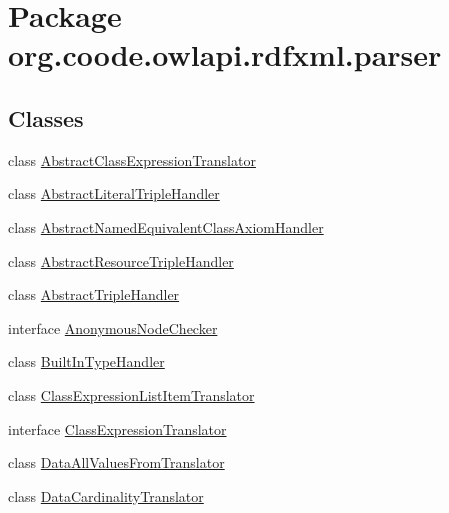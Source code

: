 \hypertarget{namespaceorg_1_1coode_1_1owlapi_1_1rdfxml_1_1parser}{\section{Package org.\-coode.\-owlapi.\-rdfxml.\-parser}
\label{namespaceorg_1_1coode_1_1owlapi_1_1rdfxml_1_1parser}
}
\subsection*{Classes}
\begin{DoxyCompactItemize}
\item 
class \hyperlink{classorg_1_1coode_1_1owlapi_1_1rdfxml_1_1parser_1_1_abstract_class_expression_translator}{Abstract\-Class\-Expression\-Translator}
\item 
class \hyperlink{classorg_1_1coode_1_1owlapi_1_1rdfxml_1_1parser_1_1_abstract_literal_triple_handler}{Abstract\-Literal\-Triple\-Handler}
\item 
class \hyperlink{classorg_1_1coode_1_1owlapi_1_1rdfxml_1_1parser_1_1_abstract_named_equivalent_class_axiom_handler}{Abstract\-Named\-Equivalent\-Class\-Axiom\-Handler}
\item 
class \hyperlink{classorg_1_1coode_1_1owlapi_1_1rdfxml_1_1parser_1_1_abstract_resource_triple_handler}{Abstract\-Resource\-Triple\-Handler}
\item 
class \hyperlink{classorg_1_1coode_1_1owlapi_1_1rdfxml_1_1parser_1_1_abstract_triple_handler}{Abstract\-Triple\-Handler}
\item 
interface \hyperlink{interfaceorg_1_1coode_1_1owlapi_1_1rdfxml_1_1parser_1_1_anonymous_node_checker}{Anonymous\-Node\-Checker}
\item 
class \hyperlink{classorg_1_1coode_1_1owlapi_1_1rdfxml_1_1parser_1_1_built_in_type_handler}{Built\-In\-Type\-Handler}
\item 
class \hyperlink{classorg_1_1coode_1_1owlapi_1_1rdfxml_1_1parser_1_1_class_expression_list_item_translator}{Class\-Expression\-List\-Item\-Translator}
\item 
interface \hyperlink{interfaceorg_1_1coode_1_1owlapi_1_1rdfxml_1_1parser_1_1_class_expression_translator}{Class\-Expression\-Translator}
\item 
class \hyperlink{classorg_1_1coode_1_1owlapi_1_1rdfxml_1_1parser_1_1_data_all_values_from_translator}{Data\-All\-Values\-From\-Translator}
\item 
class \hyperlink{classorg_1_1coode_1_1owlapi_1_1rdfxml_1_1parser_1_1_data_cardinality_translator}{Data\-Cardinality\-Translator}

\end{DoxyCompactItemize}
